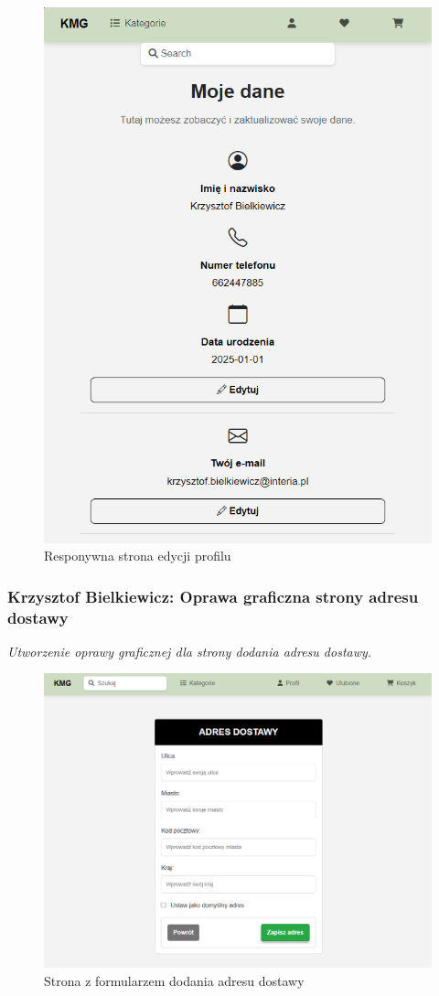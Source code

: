 \documentclass[12pt,a4paper,oneside]{article}
\theoremstyle{definition}
\numberwithin{equation}{section}
\begin{document}
\begin{figure}[H]
    \centering
    \includegraphics[width=0.5\columnwidth]{images/krzysztofBImages/profil/responywna-strona-profilu.png}
    \caption{Responywna strona edycji profilu}
\end{figure}

\subsubsection{Krzysztof Bielkiewicz: Oprawa graficzna strony adresu dostawy}
\label{1.3.7}
\textit{Utworzenie oprawy graficznej dla strony dodania adresu dostawy.}
\begin{figure}[H]
    \centering
    \includegraphics[width=0.8\columnwidth]{images/krzysztofBImages/strona-dodaj-adres.png}
    \caption{Strona z formularzem dodania adresu dostawy}
\end{figure}
\end{document}
